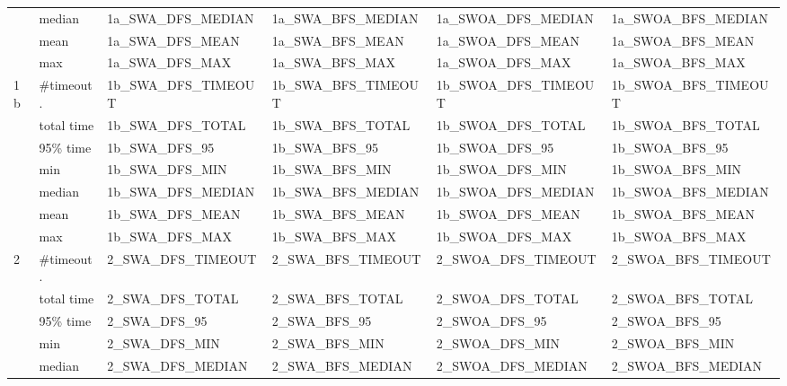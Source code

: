 \begin{table}
\begin{tabular}{|l|l|l|l|l|l|}
                      & median     & 1a_SWA_DFS_MEDIAN     & 1a_SWA_BFS_MEDIAN     & 1a_SWOA_DFS_MEDIAN    & 1a_SWOA_BFS_MEDIAN     \\
                      & mean       & 1a_SWA_DFS_MEAN       & 1a_SWA_BFS_MEAN       & 1a_SWOA_DFS_MEAN      & 1a_SWOA_BFS_MEAN       \\
                      & max        & 1a_SWA_DFS_MAX        & 1a_SWA_BFS_MAX        & 1a_SWOA_DFS_MAX       & 1a_SWOA_BFS_MAX        \\
\hline
\hline
\multirow{7}{*}{1b}   & \#timeout. & 1b_SWA_DFS_TIMEOUT    & 1b_SWA_BFS_TIMEOUT    & 1b_SWOA_DFS_TIMEOUT   & 1b_SWOA_BFS_TIMEOUT    \\
                      & total time & 1b_SWA_DFS_TOTAL      & 1b_SWA_BFS_TOTAL      & 1b_SWOA_DFS_TOTAL     & 1b_SWOA_BFS_TOTAL      \\
                      & 95\% time  & 1b_SWA_DFS_95         & 1b_SWA_BFS_95         & 1b_SWOA_DFS_95        & 1b_SWOA_BFS_95         \\
\cline{2-6}
                      & min        & 1b_SWA_DFS_MIN        & 1b_SWA_BFS_MIN        & 1b_SWOA_DFS_MIN       & 1b_SWOA_BFS_MIN        \\
                      & median     & 1b_SWA_DFS_MEDIAN     & 1b_SWA_BFS_MEDIAN     & 1b_SWOA_DFS_MEDIAN    & 1b_SWOA_BFS_MEDIAN     \\
                      & mean       & 1b_SWA_DFS_MEAN       & 1b_SWA_BFS_MEAN       & 1b_SWOA_DFS_MEAN      & 1b_SWOA_BFS_MEAN       \\
                      & max        & 1b_SWA_DFS_MAX        & 1b_SWA_BFS_MAX        & 1b_SWOA_DFS_MAX       & 1b_SWOA_BFS_MAX        \\
\hline
\hline
\multirow{7}{*}{2}    & \#timeout. & 2_SWA_DFS_TIMEOUT     & 2_SWA_BFS_TIMEOUT     & 2_SWOA_DFS_TIMEOUT    & 2_SWOA_BFS_TIMEOUT     \\
                      & total time & 2_SWA_DFS_TOTAL       & 2_SWA_BFS_TOTAL       & 2_SWOA_DFS_TOTAL      & 2_SWOA_BFS_TOTAL       \\
                      & 95\% time  & 2_SWA_DFS_95          & 2_SWA_BFS_95          & 2_SWOA_DFS_95         & 2_SWOA_BFS_95          \\
\cline{2-6}
                      & min        & 2_SWA_DFS_MIN         & 2_SWA_BFS_MIN         & 2_SWOA_DFS_MIN        & 2_SWOA_BFS_MIN         \\
                      & median     & 2_SWA_DFS_MEDIAN      & 2_SWA_BFS_MEDIAN      & 2_SWOA_DFS_MEDIAN     & 2_SWOA_BFS_MEDIAN      \\

\end{tabular}
\end{table}
